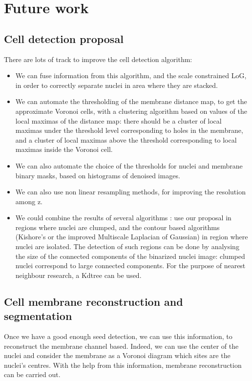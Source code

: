 \section{Future work}


\subsection{Cell detection proposal}

There are lots of track to improve the cell detection algorithm:
\begin{itemize}
  \item  We can fuse information from this algorithm, and the scale constrained LoG, in order to correctly separate nuclei in area where they are stacked.
  \item We can automate the thresholding of the membrane distance map, to get the approximate Voronoi cells, with a clustering algorithm based on values of the local maximas of the distance map: there should be a cluster of local maximas under the threshold level corresponding to holes in the membrane, and a cluster of local maximas above the threshold corresponding to local maximas inside the Voronoi cell.
  \item  We can also automate the choice of the thresholds for nuclei and membrane binary masks, based on histograms of denoised images.
  \item  We can also use non linear resampling methods, for improving the resolution among z.
  \item  We could combine the results of several algorithms  : use our proposal in regions where nuclei are clumped, 
  and the contour based algorithms (Kishore's or the improved Multiscale Laplacian of Gaussian) in region where nuclei are isolated.
  The detection of such regions can be done by analysing the size of the connected components of the binarized nuclei image:
  clumped nuclei correspond to large connected components. For the purpose of nearest neighbour research, a Kdtree can be used.
\end{itemize}


\subsection{Cell membrane reconstruction and segmentation}

Once we have a good enough seed detection, we can use this information, to reconstruct the membrane channel based.
Indeed, we can use the center of the nuclei and consider the membrane as a Voronoi diagram which sites are the nuclei's centres.
With the help from this information, membrane reconstruction can be carried out.

